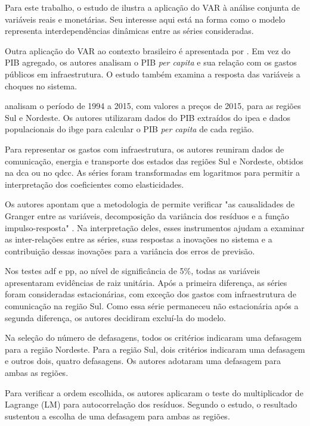 Para este trabalho, o estudo de  ilustra a aplicação do VAR à análise conjunta de variáveis reais e monetárias. Seu interesse aqui está na forma como o modelo representa interdependências dinâmicas entre as séries consideradas.

Outra aplicação do VAR ao contexto brasileiro é apresentada por . Em vez do PIB agregado, os autores analisam o PIB \textit{per capita} e sua relação com os gastos públicos em infraestrutura. O estudo também examina a resposta das variáveis a choques no sistema.

 analisam o período de 1994 a 2015, com valores a preços de 2015, para as regiões Sul e Nordeste. Os autores utilizaram dados do PIB extraídos do \ac{ipea} e dados populacionais do \ac{ibge} para calcular o PIB \textit{per capita} de cada região.

Para representar os gastos com infraestrutura, os autores reuniram dados de comunicação, energia e transporte dos estados das regiões Sul e Nordeste, obtidos na \ac{dca} ou no \ac{qdcc}. As séries foram transformadas em logaritmos para permitir a interpretação dos coeficientes como elasticidades.

Os autores apontam que a metodologia de  permite verificar "as causalidades de Granger entre as variáveis, decomposição da variância dos resíduos e a função impulso-resposta" . Na interpretação deles, esses instrumentos ajudam a examinar as inter-relações entre as séries, suas respostas a inovações no sistema e a contribuição dessas inovações para a variância dos erros de previsão.

Nos testes \ac{adf} e \ac{pp}, ao nível de significância de 5\%, todas as variáveis apresentaram evidências de raiz unitária. Após a primeira diferença, as séries foram consideradas estacionárias, com exceção dos gastos com infraestrutura de comunicação na região Sul. Como essa série permaneceu não estacionária após a segunda diferença, os autores decidiram excluí-la do modelo.

Na seleção do número de defasagens, todos os critérios indicaram uma defasagem para a região Nordeste. Para a região Sul, dois critérios indicaram uma defasagem e outros dois, quatro defasagens. Os autores adotaram uma defasagem para ambas as regiões.

Para verificar a ordem escolhida, os autores aplicaram o teste do multiplicador de Lagrange (LM) para autocorrelação dos resíduos. Segundo o estudo, o resultado sustentou a escolha de uma defasagem para ambas as regiões.

